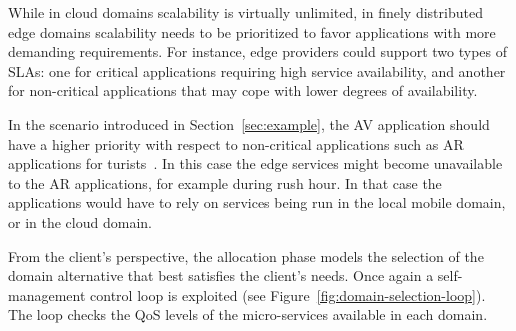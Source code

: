 
While in cloud domains scalability is virtually unlimited, in finely distributed edge domains scalability needs to be prioritized to favor applications with more demanding requirements. For instance, edge providers could support two types of SLAs: one for critical applications requiring high service availability, and another for non-critical applications that may cope with lower degrees of availability. 


In the scenario introduced in Section~\ref{sec:example}, the AV application should have a higher priority with respect to non-critical applications such as AR applications for turists~\cite{GarrigaMendonca2017}. In this case the edge services might become unavailable to the AR applications, for example during rush hour. In that case the applications would have to rely on services being run in the local mobile domain, or in the cloud domain. 


From the client's perspective, the allocation phase models the selection of the domain alternative that best satisfies the client's needs. Once again a self-management control loop is exploited (see Figure~\ref{fig:domain-selection-loop}). The loop checks the QoS levels of the micro-services available in each domain.



